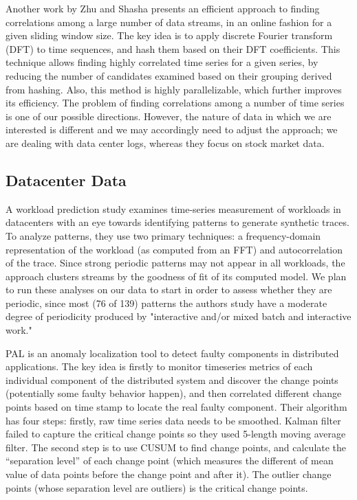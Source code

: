 Another work by Zhu and Shasha \cite{Zhu2002} presents an efficient approach to finding correlations among a large number of data streams, in an online fashion for a given sliding window size. The key idea is to apply discrete Fourier transform (DFT) to time sequences, and hash them based on their DFT coefficients. This technique allows finding highly correlated time series for a given series, by reducing the number of candidates examined based on their grouping derived from hashing. Also, this method is highly parallelizable, which further improves its efficiency. The problem of finding correlations among a number of time series is one of our possible directions. However, the nature of data in which we are interested is different and we may accordingly need to adjust the approach; we are dealing with data center logs, whereas they focus on stock market data.

\subsection{Datacenter Data}
A workload prediction study \cite{Gmach2007} examines time-series measurement of workloads in datacenters with an eye towards identifying patterns to generate synthetic traces. To analyze patterns, they use two primary techniques: a frequency-domain representation of the workload (as computed from an FFT) and autocorrelation of the trace. Since strong periodic patterns may not appear in all workloads, the approach clusters streams by the goodness of fit of its computed model. We plan to run these analyses on our data to start in order to assess whether they are periodic, since most (76 of 139) patterns the authors study have a moderate degree of periodicity produced by "interactive and/or mixed batch and interactive work."

PAL is an anomaly localization tool to detect faulty components in distributed applications. The key idea is firstly to monitor timeseries metrics of each individual component of the distributed system and discover the change points (potentially some faulty behavior happen), and then correlated different change points based on time stamp to locate the real faulty component. Their algorithm has four steps: firstly, raw time series data needs to be smoothed. Kalman filter failed to capture the critical change points so they used 5-length moving average filter. The second step is to use CUSUM to find change points, and calculate the “separation level” of each change point (which measures the different of mean value of data points before the change point and after it). The outlier change points (whose separation level are outliers) is the critical change points.

